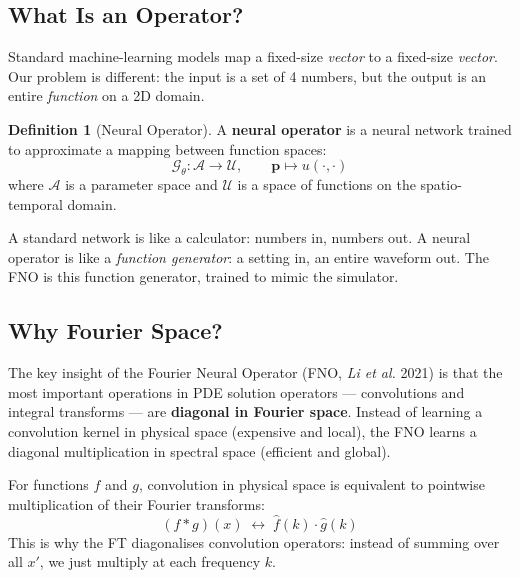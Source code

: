 \documentclass[12pt, a4paper]{article}
\theoremstyle{definition}
\newtheorem{definition}{Definition}[section]
\newcommand{\G}{\mathcal{G}_\theta}
\begin{document}
\subsection{What Is an Operator?}

Standard machine-learning models map a fixed-size \textit{vector} to a
fixed-size \textit{vector}.  Our problem is different: the input is a set of
4 numbers, but the output is an entire \textit{function} on a 2D domain.

\begin{definition}[Neural Operator]
  A \textbf{neural operator} is a neural network trained to approximate a
  mapping between function spaces:
  \[
    \G : \mathcal{A} \to \mathcal{U}, \qquad
    \bm{p} \mapsto u(\cdot, \cdot)
  \]
  where $\mathcal{A}$ is a parameter space and $\mathcal{U}$ is a space of
  functions on the spatio-temporal domain.
\end{definition}

\begin{tcolorbox}[highlight=myorange, title=Analogy: A Function-Valued Machine]
  A standard network is like a calculator: numbers in, numbers out.
  A neural operator is like a \textit{function generator}: a setting in,
  an entire waveform out.  The FNO is this function generator, trained to
  mimic the simulator.
\end{tcolorbox}

\subsection{Why Fourier Space?}

The key insight of the Fourier Neural Operator (FNO, \textit{Li et al.} 2021)
is that the most important operations in PDE solution operators —
convolutions and integral transforms — are \textbf{diagonal in Fourier space}.
Instead of learning a convolution kernel in physical space (expensive and
local), the FNO learns a diagonal multiplication in spectral space (efficient
and global).

\begin{tcolorbox}[highlight=myblue, title=Convolution Theorem]
  For functions $f$ and $g$, convolution in physical space is equivalent to
  pointwise multiplication of their Fourier transforms:
  \[
    (f * g)(x) \;\longleftrightarrow\; \hat{f}(k)\cdot\hat{g}(k)
  \]
  This is why the FT diagonalises convolution operators: instead of summing
  over all $x'$, we just multiply at each frequency $k$.
\end{tcolorbox}
\end{document}
